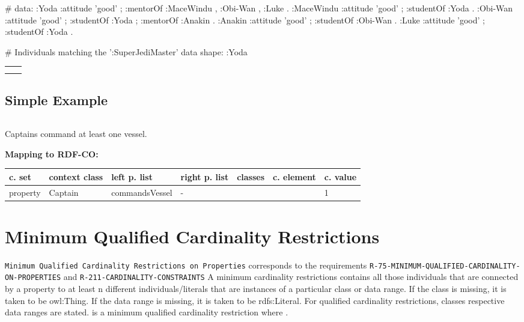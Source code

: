 \documentclass{llncs}
\newcommand{\ms}[1]{\texttt{#1}}
\newenvironment{gcotable}{
  \scriptsize
  \sffamily
  \vspace{0cm}
	\begin{center}
	\textbf{\vspace{0.4cm}Mapping to RDF-CO:} \\
  \begin{tabular}{l|l|l|l|l|l|l}
	\hline
  \textbf{c. set} & \textbf{context class} & \textbf{left p. list} & \textbf{right p. list} & \textbf{classes} & \textbf{c. element} & \textbf{c. value} \\
  \hline

}{
  \hline
  \end{tabular}
	\end{center}
}
\newenvironment{DL}{
\vspace{0cm}
	\begin{center}
  \begin{tabular}{r l}

}{
  \end{tabular}
	\end{center}
}
\begin{document}
\begin{ex}
# data:
:Yoda 
    :attitude 'good' ;
    :mentorOf :MaceWindu , :Obi-Wan , :Luke .
:MaceWindu
    :attitude 'good' ;
    :studentOf :Yoda .
:Obi-Wan 
    :attitude 'good' ;
    :studentOf :Yoda ;
    :mentorOf :Anakin .
:Anakin
    :attitude 'good' ; 
    :studentOf :Obi-Wan .
:Luke
    :attitude 'good' ;
    :studentOf :Yoda .
\end{ex}

\begin{ex}
# Individuals matching the ’:SuperJediMaster’ data shape:
:Yoda 
\end{ex}

\begin{DL}
\\
 \\
\\

\end{DL}

\subsection{Simple Example}

\begin{DL}

\end{DL}

Captains command at least one vessel.

\begin{gcotable}
property & Captain & commandsVessel & - &  &  & 1 \\
\end{gcotable}

\section{Minimum Qualified Cardinality Restrictions}

\ms{Minimum Qualified Cardinality Restrictions on Properties} corresponds to the requirements
\ms{R-75-MINIMUM-QUALIFIED-CARDINALITY-ON-PROPERTIES} and \ms{R-211-CARDINALITY-CONSTRAINTS}
A minimum cardinality restrictions contains all those individuals that are connected by a property to at least n different individuals/literals 
that are instances of a particular class or data range. If the class is missing, it is taken to be owl:Thing. 
If the data range is missing, it is taken to be rdfs:Literal.
For qualified cardinality restrictions, classes respective data ranges are stated.
 is a minimum qualified cardinality restriction where .
\end{document}
